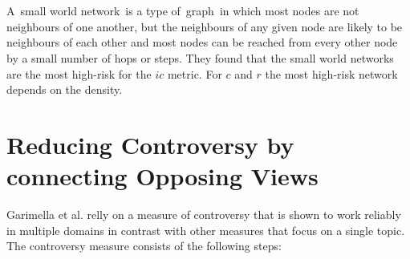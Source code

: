  \\
 \\
 A small world network is a type of graph in which most nodes are not neighbours of one another, but the neighbours of any given node are likely to be neighbours of each other and most nodes can be reached from every other node by a small number of hops or steps. They found that the small world networks are the most high-risk for the $ic$ metric. For $c$ and $r$ the most high-risk network depends on the density.\cite{chen}

\section{Reducing Controversy by connecting Opposing Views}
\label{sec:reducing}

Garimella et al. relly on a measure of controversy that is shown to work reliably in multiple domains in contrast with other measures that focus on a single topic. The controversy measure consists of the following steps:

